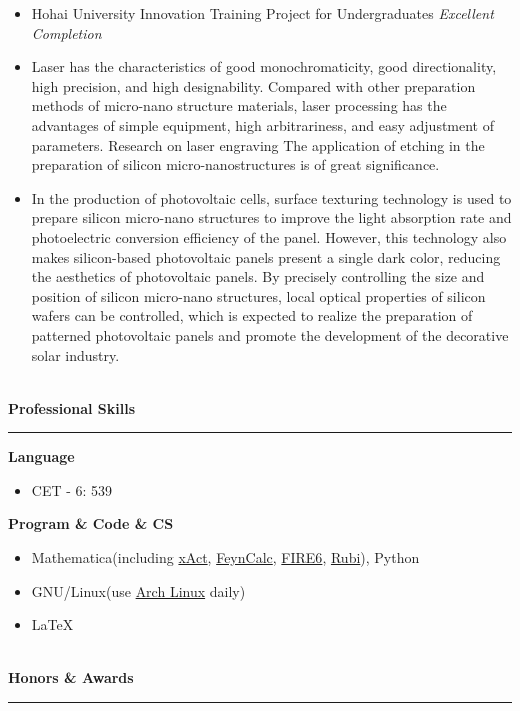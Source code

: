 \documentclass[12pt]{article}
\newcommand{\sect}[1]{
    ~\\ \noindent \textbf{#1} \medskip \hrule \medskip
}
\begin{document}
\begin{itemize}[noitemsep,nolistsep]
    \item Hohai University Innovation Training Project for Undergraduates \textit{Excellent Completion}
    \item Laser has the characteristics of good monochromaticity, good directionality, high precision, and high designability. Compared with other preparation methods of micro-nano structure materials, laser processing has the advantages of simple equipment, high arbitrariness, and easy adjustment of parameters. Research on laser engraving The application of etching in the preparation of silicon micro-nanostructures is of great significance.
    \item In the production of photovoltaic cells, surface texturing technology is used to prepare silicon micro-nano structures to improve the light absorption rate and photoelectric conversion efficiency of the panel. However, this technology also makes silicon-based photovoltaic panels present a single dark color, reducing the aesthetics of photovoltaic panels. By precisely controlling the size and position of silicon micro-nano structures, local optical properties of silicon wafers can be controlled, which is expected to realize the preparation of patterned photovoltaic panels and promote the development of the decorative solar industry.
\end{itemize}


\sect{Professional Skills}

\textbf{Language}
\begin{itemize}[noitemsep,nolistsep]
    \item CET - 6: 539
\end{itemize}

\textbf{Program \& Code \& CS}
\begin{itemize}[noitemsep,nolistsep]
    \item Mathematica(including \href{http://xact.es/index.html}{xAct}, \href{https://feyncalc.github.io/}{FeynCalc}, \href{https://arxiv.org/abs/1901.07808}{FIRE6}, \href{https://rulebasedintegration.org/}{Rubi}), Python
    \item GNU/Linux(use \href{https://archlinux.org/}{Arch Linux} daily)
    \item \LaTeX
\end{itemize}


\sect{Honors \& Awards}
\end{document}
